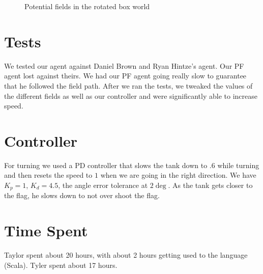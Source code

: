 \documentclass[11pt]{article}
\begin{document}
\begin{figure}[H]
	\caption{Potential fields in the rotated box world}
\end{figure}



\section{Tests}
We tested our agent against Daniel Brown and Ryan Hintze's agent.
Our PF agent lost against theirs.
We had our PF agent going really slow to guarantee that he followed the field path.
After we ran the tests, we tweaked the values of the different fields as well as our controller and were significantly able to increase speed.

\section{Controller}
For turning we used a PD controller that slows the tank down to $.6$ while turning and then resets the speed to $1$ when we are going in the right direction.
We have $K_p = 1$, $K_d = 4.5$, the angle error tolerance at $2 \deg$.
As the tank gets closer to the flag, he slows down to not over shoot the flag.

\section{Time Spent}
Taylor spent about 20 hours, with about 2 hours getting used to the language (Scala).
Tyler spent about 17 hours.
\end{document}
